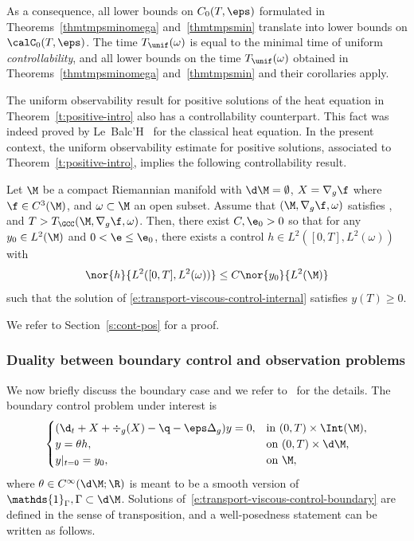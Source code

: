 As a consequence, all lower bounds on $C_0(T,\eps)$ formulated in Theorems~\ref{thmtmpsminomega} and~\ref{thmtmpsmin} translate into lower bounds on $\calC_0(T,\eps)$. The time $T_{\unif}(\omega)$ is equal to the minimal time of uniform {\em controllability}, and all lower bounds on the time $T_{\unif}(\omega)$ obtained in Theorems~\ref{thmtmpsminomega} and~\ref{thmtmpsmin} and their corollaries apply.

The uniform observability result for positive solutions of the heat equation in Theorem~\ref{t:positive-intro} also has a controllability counterpart.
This fact was indeed proved by Le~Balc'H~\cite[Th.\,4.1]{L:18} for the classical heat equation.
In the present context, the uniform observability estimate for positive solutions, associated to Theorem~\ref{t:positive-intro}, implies the following controllability result.
\begin{corollary}
\label{corcontrol+}
Let $\M$ be a compact Riemannian manifold with $\d\M=\emptyset$, $X=\nabla_{g} \f$ where $\f\in C^{3}(\M)$, and $\omega\subset \M$ an open subset. Assume that $(\M, \nabla_{g} \f,\omega)$ satisfies \pGCC, and $T>T_{\GCC}(\M, \nabla_{g} \f,\omega)$. Then, there exist $C,\e_0>0$ so that for any $y_{0}\in L^{2}(\M)$ and $0<\e\leq \e_{0}$, there exists a control $h\in L^2([0,T],L^2(\omega))$ with
\[
\nor{h}{L^2([0,T],L^2(\omega))}\leq C\nor{y_{0}}{L^{2}(\M)}
\]
such that the solution of \eqref{e:transport-viscous-control-internal} satisfies $y(T)\geq0$.
\end{corollary}
We refer to Section~\ref{s:cont-pos} for a proof.

\subsubsection{Duality between boundary control and observation problems}
\label{s:boundary-shit}
We now briefly discuss the boundary case and we refer to~\cite{GL:07} for the details.
The boundary control problem under interest is
\begin{equation}
\label{e:transport-viscous-control-boundary}
\begin{cases}
(\d_t + X + \div_{g}(X) -\q - \eps \Delta_g ) y = 0, & \text{in } (0,T)\times \Int( \M), \\
y = \theta h, & \text{on } (0,T)\times \d\M, \\
y|_{t=0} = y_0, & \text{on } \M,
\end{cases}
\end{equation}
where $\theta \in C^\infty(\d\M ; \R)$ is meant to be a smooth version of $\mathds{1}_\Gamma, \Gamma \subset \d\M$.
Solutions of~\eqref{e:transport-viscous-control-boundary} are defined in the sense of transposition, and a well-posedness statement can be written as follows.

